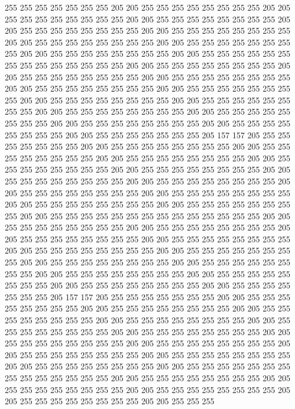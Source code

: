 255 255 255 255 255 255 255 205 205 255 255 255 255 255 255 255 255 205 205 255
255 255 255 255 255 255 255 205 205 255 255 255 255 255 255 255 255 205 205 255
255 255 255 255 255 255 255 205 205 255 255 255 255 255 255 255 255 205 205 255
255 255 255 255 255 255 255 205 205 255 255 255 255 255 255 255 255 205 205 255
255 255 255 255 255 255 255 205 205 255 255 255 255 255 255 255 255 255 255 255
255 255 255 205 205 255 255 255 255 255 255 255 255 205 205 255 255 255 255 255
255 255 255 205 205 255 255 255 255 255 255 255 255 205 205 255 255 255 255 255
255 255 255 205 205 255 255 255 255 255 255 255 255 205 205 255 255 255 255 255
255 255 255 205 205 255 255 255 255 255 255 255 255 205 205 255 255 255 255 255
255 255 255 205 205 255 255 255 255 255 255 255 255 205 205 255 255 255 255 255
255 255 255 205 205 255 255 255 255 255 255 255 255 205 205 255 255 255 255 255
255 255 205 157 157 205 255 255 255 255 255 255 255 205 205 255 255 255 255 255
255 255 255 205 205 255 255 255 255 255 255 255 255 205 205 255 255 255 255 255
255 255 255 205 205 255 255 255 255 255 255 255 255 205 205 255 255 255 255 255
255 255 255 205 205 255 255 255 255 255 255 255 255 205 205 255 255 255 255 255
255 255 255 205 205 255 255 255 255 255 255 255 255 205 205 255 255 255 255 255
255 255 255 205 205 255 255 255 255 255 255 255 255 205 205 255 255 255 255 255
255 255 255 205 205 255 255 255 255 255 255 255 255 255 255 255 255 255 255 205
205 255 255 255 255 255 255 255 255 205 205 255 255 255 255 255 255 255 255 205
205 255 255 255 255 255 255 255 255 205 205 255 255 255 255 255 255 255 255 205
205 255 255 255 255 255 255 255 255 205 205 255 255 255 255 255 255 255 255 205
205 255 255 255 255 255 255 255 255 205 205 255 255 255 255 255 255 255 255 205
205 255 255 255 255 255 255 255 255 205 205 255 255 255 255 255 255 255 255 205
205 255 255 255 255 255 255 255 255 205 205 255 255 255 255 255 255 255 205 157
157 205 255 255 255 255 255 255 255 205 205 255 255 255 255 255 255 255 255 205
205 255 255 255 255 255 255 255 255 205 205 255 255 255 255 255 255 255 255 205
205 255 255 255 255 255 255 255 255 205 205 255 255 255 255 255 255 255 255 205
205 255 255 255 255 255 255 255 255 205 205 255 255 255 255 255 255 255 255 205
205 255 255 255 255 255 255 255 255 205 205 255 255 255 255 255 255 255 255 205
205 255 255 255 255 255 255 255 255 205 205 255 255 255 255 255 255 255 255 205
205 255 255 255 255 255 255 255 255 255 255 255 255 255 255 205 205 255 255 255
255 255 255 255 255 205 205 255 255 255 255 255 255 255 255 205 205 255 255 255
255 255 255 255 255 205 205 255 255 255 255 255 255 255 255 205 205 255 255 255
